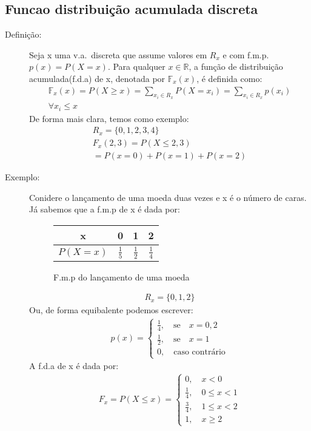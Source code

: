  \subsection{Funcao distribuição acumulada discreta}
 \begin{description}
   \item [Definição:] Seja x uma v.a.\ discreta que assume valores em $R_{x}$ e com f.m.p.\
     $p(x)=P(X=x)$. Para qualquer $x \in \mathbb{R}$, a função de distribuição 
     acumulada(f.d.a) de x, denotada por $\mathbb{F}_{x}(x)$, é definida como: 
     \begin{align}
       \mathbb{F}_{x}(x)=P(X \geq x )= \sum_{x_{i} \in R_{x}} P(X=x_i) = \sum_{x_{i} \in R_{x}} p(x_i) \\
       \forall x_i \le x \nonumber
     \end{align}
     De forma mais clara, temos como exemplo: 
     \begin{align*}
       R_{x}= \{0,1,2,3,4 \}\\
       F_{x}(2,3)= P(X\le 2,3)\\
       = P(x=0)+P(x=1)+P(x=2)
     \end{align*}
   \item [Exemplo: ]
     Conidere o lançamento de uma moeda duas vezes e x é o número de caras. Já sabemos
     que a f.m.p de x é dada por:
     \begin{figure} 
       \centering
       \begin{tabular}{c c c c}
         \toprule
         x&0&1&2\\ \midrule
         $P(X=x)$&$\frac{1}{5}$&$\frac{1}{2}$&$\frac{1}{4}$\\ \bottomrule
       \end{tabular}
       \label{tab:5}
       \caption{F.m.p do lançamento de uma moeda}
     \end{figure}
     \begin{align*}
       R_{x}=\{0,1,2\}
     \end{align*}
     Ou, de forma equibalente podemos escrever: 
     \begin{align*}
       p(x)=
       \begin{cases}
         \frac{1}{4}, \quad \text{se} \quad x=0,2\\
         \frac{1}{2}, \quad \text{se} \quad x=1\\
         0,\quad  \text{caso contrário}
       \end{cases}
     \end{align*}
     A f.d.a de x é dada por:
     \begin{align*}
       F_{x}=P(X\le x)= 
       \begin{cases}
         0,\quad  x<0 \\
         \frac{1}{4}, \quad 0 \le x <1\\
         \frac{3}{4}, \quad 1 \le x < 2\\
         1, \quad x \geq 2
       \end{cases}
     \end{align*}
 \end{description}
